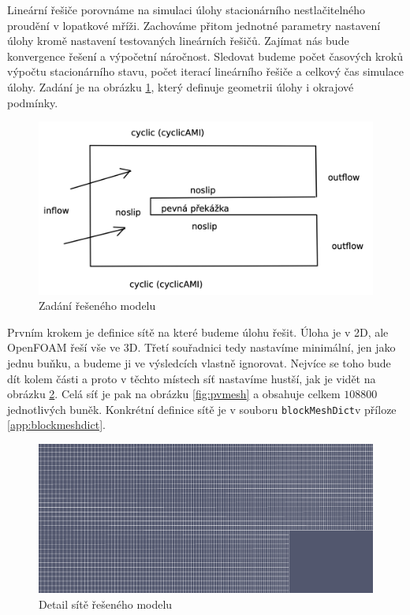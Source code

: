 \documentclass[a4paper,12pt]{report}
\theoremstyle{remark}
\begin{document}
	Lineární řešiče porovnáme na simulaci úlohy stacionárního nestlačitelného proudění v lopatkové mříži. Zachováme přitom jednotné parametry nastavení úlohy kromě nastavení testovaných lineárních řešičů. Zajímat nás bude konvergence řešení a výpočetní náročnost. Sledovat budeme počet časových kroků výpočtu stacionárního stavu, počet iterací lineárního řešiče a celkový čas simulace úlohy. Zadání je na obrázku \ref{fig:zadani}, který definuje geometrii úlohy i okrajové podmínky. 
	\begin{figure}[H]
		\centering
		\includegraphics[width=1\linewidth]{zadani.png}
		\caption{Zadání řešeného modelu}
		\label{fig:zadani}
	\end{figure}
Prvním krokem je definice sítě na které budeme úlohu řešit. Úloha je v 2D, ale OpenFOAM řeší vše ve 3D. Třetí souřadnici tedy nastavíme minimální, jen jako jednu buňku, a budeme ji ve výsledcích vlastně ignorovat.  Nejvíce se toho bude dít kolem  části a proto v těchto místech síť nastavíme hustší, jak je vidět na obrázku \ref{fig:pvmesh-detail}. Celá síť je pak na obrázku \ref{fig:pvmesh} a obsahuje celkem $108 800$ jednotlivých buněk. Konkrétní definice sítě je v souboru \texttt{blockMeshDict}\linebreak v příloze \ref{app:blockmeshdict}.
\begin{figure}[H]
	\centering
	\includegraphics[width=1\linewidth]{pv-mesh-detail.png}
	\caption{Detail sítě řešeného modelu}
	\label{fig:pvmesh-detail}
\end{figure}
\end{document}
